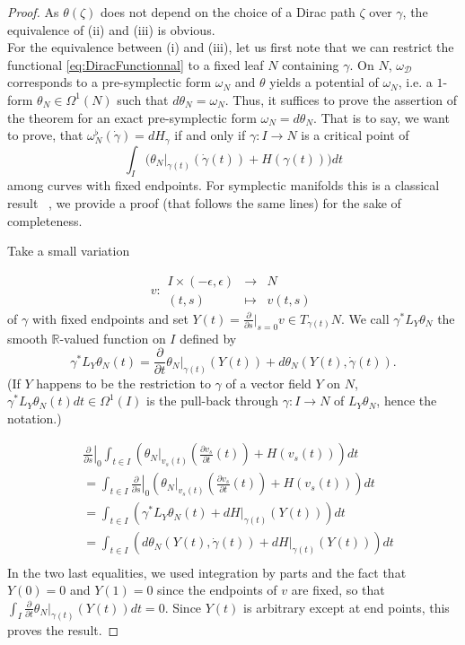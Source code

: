 \documentclass[a4paper,12pt]{amsart}
\theoremstyle{definition}
\newcommand{\CLG}[1]{{ \framebox{CLG:}~#1~\framebox{:CLG}}}
\newcommand{\leaf}[0]{{N}}
\begin{document}
\begin{proof}
As $\theta(\zeta)$ does not depend on the choice of a Dirac path $\zeta$ over $\gamma$, the equivalence of  (ii) and  (iii) is obvious. \\

For the equivalence between (i) and (iii), let us first note that we can restrict the functional \eqref{eq:DiracFunctionnal} to a fixed leaf $\leaf$ containing $\gamma$. On $\leaf$, $\omega_{\mathcal D}$ corresponds to a pre-symplectic form $\omega_\leaf$ and $\theta$ yields a potential of  $\omega_\leaf$, i.e. a $1$-form $\theta_\leaf \in \Omega^1(\leaf)$ such that $d \theta_\leaf = \omega_\leaf$.  
Thus, it suffices to prove the assertion of the theorem for an exact pre-symplectic form $\omega_\leaf ={d} \theta_\leaf $. That is to say, we want to prove, that $\omega_\leaf^\flat(\dot \gamma)=dH_\gamma$ if and only if $\gamma: I \to \leaf$ is a critical point of 
$$\int_I \big(\theta_\leaf|_{\gamma(t)} (\dot \gamma(t))+H(\gamma(t)) \big ) dt$$
among curves with fixed endpoints. For symplectic manifolds this is a classical result ~\cite{arnold}, we provide a proof (that follows the same lines) for the sake of completeness.

Take a small variation 

$$v : \begin{array}{lrcl}
I\times (-\epsilon,\epsilon) & \to & \leaf \\
(t,s) & \mapsto & v(t,s) \end{array}$$ of $\gamma$ with fixed endpoints and set $Y(t) = \frac{\partial}{\partial s}\big|_{s=0}v \in T_{\gamma(t)} \leaf $. 
We call $\gamma^* L_Y\theta_\leaf$ the smooth $\mathbb R $-valued function on $I$ defined by
$$ \gamma^* L_Y\theta_\leaf(t) = \frac{\partial}{ \partial t} \theta_\leaf |_{\gamma(t)} ( Y(t) ) + d \theta_\leaf (Y(t) , \dot \gamma(t) )  .  $$
(If $Y$ happens to be the restriction to $\gamma $ of a vector field $Y$ on $\leaf$, $\gamma^* L_Y\theta_\leaf(t)dt \in \Omega^1(I)$ is the pull-back through $\gamma: I \to \leaf $ of $L_Y  \theta_\leaf $, hence the notation.)

\begin{align*}
& \left. \frac{\partial}{\partial s}\right|_0 \int_{t \in I} \left( \theta_\leaf|_{v_s(t)} \left(\frac{\partial{ v_s}}{\partial t }(t)\right)+H(v_s(t)) \right)dt \\ 
& = \int_{t \in I} \left. \frac{\partial}{\partial s}\right|_0 \left( \theta_\leaf|_{v_s(t)} \left(\frac{\partial{ v_s}}{\partial t }(t)\right)+H(v_s(t)) \right)dt \\
&=  \int_{t \in I}  \left( \gamma^* L_Y\theta_\leaf(t)  +dH|_{\gamma(t)}  (Y(t)) \right)dt
\\ &= \int_{t \in I}  \left(  d \theta_\leaf (Y(t) , \dot \gamma(t) )  +dH|_{\gamma(t)}  (Y(t)) \right)dt  \\
 \end{align*}
In the two last equalities, we used integration by parts and the fact that $Y(0)=0$ and $Y(1)=0$ since the endpoints of $v$ are fixed, so that $ \int_I  \frac{\partial}{ \partial t} \theta_\leaf |_{\gamma(t)} ( Y(t) ) dt =0$.
Since $Y(t)$ is arbitrary except at end points, this proves the result.
\end{proof}
\end{document}
